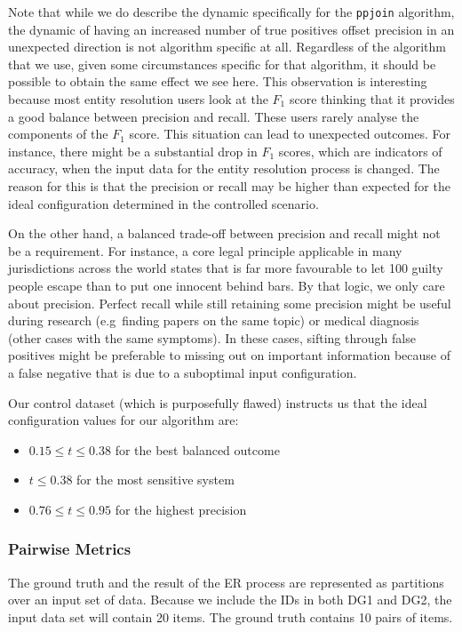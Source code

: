 Note that while we do describe the dynamic specifically for the \texttt{ppjoin}
algorithm, the dynamic of having an increased number of true positives offset
precision in an unexpected direction is not algorithm specific at all.
Regardless of the algorithm that we use, given some circumstances specific for
that algorithm, it should be possible to obtain the same effect we see here.
This observation is interesting because most entity resolution users look at the
$F_1$ score thinking that it provides a good balance between precision and recall.
These users rarely analyse the components of the $F_1$ score.
This situation can lead to unexpected outcomes.
For instance, there might be a substantial drop in $F_1$ scores, which are
indicators of accuracy, when the input data for the entity resolution process is
changed.
The reason for this is that the precision or recall may be higher than expected
for the ideal configuration determined in the controlled scenario.

On the other hand, a balanced trade-off between precision and recall might not
be a requirement.
For instance, a core legal principle applicable in many jurisdictions across the
world states that is far more favourable to let 100 guilty people escape than to
put one innocent behind bars.
By that logic, we only care about precision.
Perfect recall while still retaining some precision might be useful during
research (e.g~finding papers on the same topic) or medical diagnosis (other
cases with the same symptoms).
In these cases, sifting through false positives might be preferable to missing
out on important information because of a false negative that is due to a
suboptimal input configuration.

Our control dataset (which is purposefully flawed) instructs us that the ideal
configuration values for our algorithm are:
\begin{itemize}
    \item $0.15 \leq t \leq 0.38$ for the best balanced outcome
    \item $t \leq 0.38$ for the most sensitive system
    \item $0.76 \leq t \leq 0.95$ for the highest precision
\end{itemize}

\subsubsection{Pairwise Metrics}\label{subsubsec:Pairwise Results}

The ground truth and the result of the ER process are represented as partitions
over an input set of data.
Because we include the IDs in both DG1 and DG2, the input data set will
contain 20 items.
The ground truth contains 10 pairs of items.

